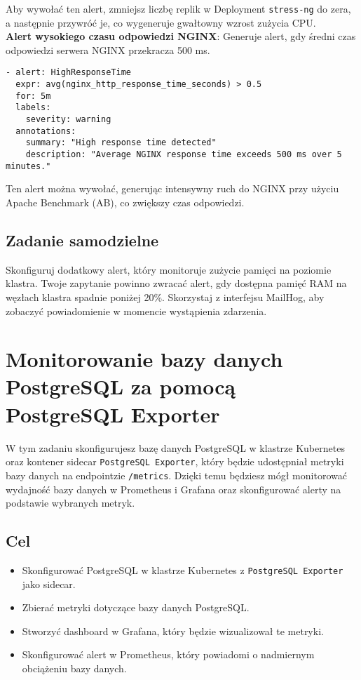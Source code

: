 \documentclass{article}
\begin{document}
Aby wywołać ten alert, zmniejsz liczbę replik w Deployment \texttt{stress-ng} do zera, a następnie przywróć je, co wygeneruje gwałtowny wzrost zużycia CPU.
\\
\textbf{Alert wysokiego czasu odpowiedzi NGINX}: Generuje alert, gdy średni czas odpowiedzi serwera NGINX przekracza 500 ms.
\begin{lstlisting}
- alert: HighResponseTime
  expr: avg(nginx_http_response_time_seconds) > 0.5
  for: 5m
  labels:
    severity: warning
  annotations:
    summary: "High response time detected"
    description: "Average NGINX response time exceeds 500 ms over 5 minutes."
\end{lstlisting}

Ten alert można wywołać, generując intensywny ruch do NGINX przy użyciu Apache Benchmark (AB), co zwiększy czas odpowiedzi.


\subsection{Zadanie samodzielne}

Skonfiguruj dodatkowy alert, który monitoruje zużycie pamięci na poziomie klastra. Twoje zapytanie powinno zwracać alert, gdy dostępna pamięć RAM na węzłach klastra spadnie poniżej 20\%. Skorzystaj z interfejsu MailHog, aby zobaczyć powiadomienie w momencie wystąpienia zdarzenia.

\section{Monitorowanie bazy danych PostgreSQL za pomocą PostgreSQL Exporter}

W tym zadaniu skonfigurujesz bazę danych PostgreSQL w klastrze Kubernetes oraz kontener sidecar \texttt{PostgreSQL Exporter}, który będzie udostępniał metryki bazy danych na endpointzie \texttt{/metrics}. Dzięki temu będziesz mógł monitorować wydajność bazy danych w Prometheus i Grafana oraz skonfigurować alerty na podstawie wybranych metryk.

\subsection{Cel}
\begin{itemize}
    \item Skonfigurować PostgreSQL w klastrze Kubernetes z \texttt{PostgreSQL Exporter} jako sidecar.
    \item Zbierać metryki dotyczące bazy danych PostgreSQL.
    \item Stworzyć dashboard w Grafana, który będzie wizualizował te metryki.
    \item Skonfigurować alert w Prometheus, który powiadomi o nadmiernym obciążeniu bazy danych.
\end{itemize}
\end{document}
